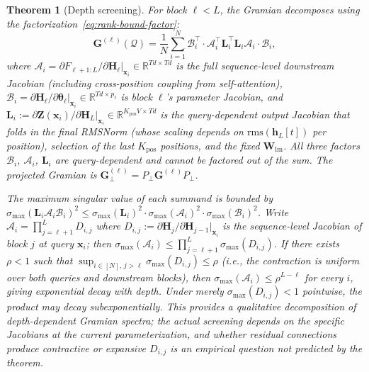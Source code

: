 \documentclass{article}
\newtheorem{theorem}{Theorem}
\newcommand{\R}{\mathbb{R}}
\newcommand{\cQ}{\mathcal{Q}}
\newcommand{\btheta}{\boldsymbol{\theta}}
\newcommand{\bh}{\mathbf{h}}
\newcommand{\bx}{\mathbf{x}}
\newcommand{\bW}{\mathbf{W}}
\newcommand{\bG}{\mathbf{G}}
\newcommand{\bH}{\mathbf{H}}
\newcommand{\bZ}{\mathbf{Z}}
\newcommand{\bL}{\mathbf{L}}
\newcommand{\cA}{\mathcal{A}}
\newcommand{\cB}{\mathcal{B}}
\begin{document}
\begin{theorem}[Depth screening]
\label{thm:screening}
For block $\ell < L$, the Gramian decomposes using the factorization~\eqref{eq:rank-bound-factor}:
\begin{equation}\label{eq:screening}
 \bG^{(\ell)}(\cQ) = \frac{1}{N}\sum_{i=1}^{N} \cB_i^\top \cdot \cA_i^\top \bL_i^\top \bL_i \cA_i \cdot \cB_i,
\end{equation}
where $\cA_i = \partial F_{\ell+1:L}/\partial \bH_\ell|_{\bx_i} \in \R^{Td \times Td}$ is the full sequence-level downstream Jacobian (including cross-position coupling from self-attention), $\cB_i = \partial \bH_\ell / \partial \btheta_\ell|_{\bx_i} \in \R^{Td \times p_\ell}$ is block $\ell$'s parameter Jacobian, and $\bL_i := \partial \bZ(\bx_i)/\partial \bH_L|_{\bx_i} \in \R^{K_{\text{pos}} V \times Td}$ is the query-dependent output Jacobian that folds in the final RMSNorm (whose scaling depends on $\mathrm{rms}(\bh_L[t])$ per position), selection of the last $K_{\text{pos}}$ positions, and the fixed $\bW_{\text{lm}}$. All three factors $\cB_i$, $\cA_i$, $\bL_i$ are query-dependent and cannot be factored out of the sum. The projected Gramian is $\bG_\perp^{(\ell)} = P_\perp \bG^{(\ell)} P_\perp$.

The maximum singular value of each summand is bounded by $\sigma_{\max}(\bL_i \cA_i \cB_i)^2 \leq \sigma_{\max}(\bL_i)^2 \cdot \sigma_{\max}(\cA_i)^2 \cdot \sigma_{\max}(\cB_i)^2$. Write $\cA_i = \prod_{j=\ell+1}^{L} D_{i,j}$ where $D_{i,j} := \partial \bH_j/\partial \bH_{j-1}|_{\bx_i}$ is the sequence-level Jacobian of block $j$ at query $\bx_i$; then $\sigma_{\max}(\cA_i) \leq \prod_{j=\ell+1}^{L} \sigma_{\max}(D_{i,j})$. If there exists $\rho < 1$ such that $\sup_{i \in [N],\, j > \ell} \sigma_{\max}(D_{i,j}) \leq \rho$ (i.e., the contraction is uniform over both queries and downstream blocks), then $\sigma_{\max}(\cA_i) \leq \rho^{L-\ell}$ for every $i$, giving exponential decay with depth. Under merely $\sigma_{\max}(D_{i,j}) < 1$ pointwise, the product may decay subexponentially. This provides a qualitative decomposition of depth-dependent Gramian spectra; the actual screening depends on the specific Jacobians at the current parameterization, and whether residual connections produce contractive or expansive $D_{i,j}$ is an empirical question not predicted by the theorem.
\end{theorem}
\end{document}
